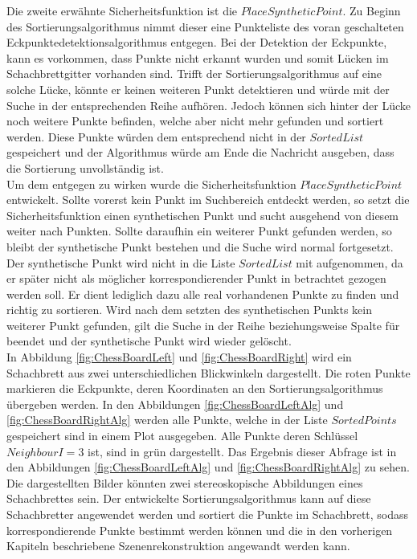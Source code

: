 Die zweite erwähnte Sicherheitsfunktion ist die $PlaceSyntheticPoint$. Zu Beginn des Sortierungsalgorithmus nimmt dieser eine Punkteliste des voran geschalteten Eckpunktedetektionsalgorithmus entgegen. Bei der Detektion der Eckpunkte, kann es vorkommen, dass Punkte nicht erkannt wurden und somit Lücken im Schachbrettgitter vorhanden sind. Trifft der Sortierungsalgorithmus auf eine solche Lücke, könnte er keinen weiteren Punkt detektieren und würde mit der Suche in der entsprechenden Reihe aufhören. Jedoch können sich hinter der Lücke noch weitere Punkte befinden, welche aber nicht mehr gefunden und sortiert werden. Diese Punkte würden dem entsprechend nicht in der $SortedList$ gespeichert und der Algorithmus würde am Ende die Nachricht ausgeben, dass die Sortierung unvollständig ist.\\

Um dem entgegen zu wirken wurde die Sicherheitsfunktion $PlaceSyntheticPoint$ entwickelt. Sollte vorerst kein Punkt im Suchbereich entdeckt werden, so setzt die Sicherheitsfunktion einen synthetischen Punkt und sucht ausgehend von diesem weiter nach Punkten. Sollte daraufhin ein weiterer Punkt gefunden werden, so bleibt der synthetische Punkt bestehen und die Suche wird normal fortgesetzt. Der synthetische Punkt wird nicht in die Liste $SortedList$ mit aufgenommen, da er später nicht als möglicher korrespondierender Punkt in betrachtet gezogen werden soll. Er dient lediglich dazu alle real vorhandenen Punkte zu finden und richtig zu sortieren. Wird nach dem setzten des synthetischen Punkts kein weiterer Punkt gefunden, gilt die Suche in der Reihe beziehungsweise Spalte für beendet und der synthetische Punkt wird wieder gelöscht. \\


In Abbildung \ref{fig:ChessBoardLeft} und \ref{fig:ChessBoardRight} wird ein Schachbrett aus zwei unterschiedlichen Blickwinkeln dargestellt. Die roten Punkte markieren die Eckpunkte, deren Koordinaten an den Sortierungsalgorithmus übergeben werden. In den Abbildungen \ref{fig:ChessBoardLeftAlg} und \ref{fig:ChessBoardRightAlg} werden alle Punkte, welche in der Liste $SortedPoints$ gespeichert sind in einem Plot ausgegeben. Alle Punkte deren Schlüssel $NeighbourI = 3$ ist, sind in grün dargestellt. Das Ergebnis dieser Abfrage ist in den Abbildungen \ref{fig:ChessBoardLeftAlg} und \ref{fig:ChessBoardRightAlg} zu sehen. Die dargestellten Bilder könnten zwei stereoskopische Abbildungen eines Schachbrettes sein. Der entwickelte Sortierungsalgorithmus kann auf diese Schachbretter angewendet werden und sortiert die Punkte im Schachbrett, sodass korrespondierende Punkte bestimmt werden können und die in den vorherigen Kapiteln beschriebene Szenenrekonstruktion angewandt werden kann. 



